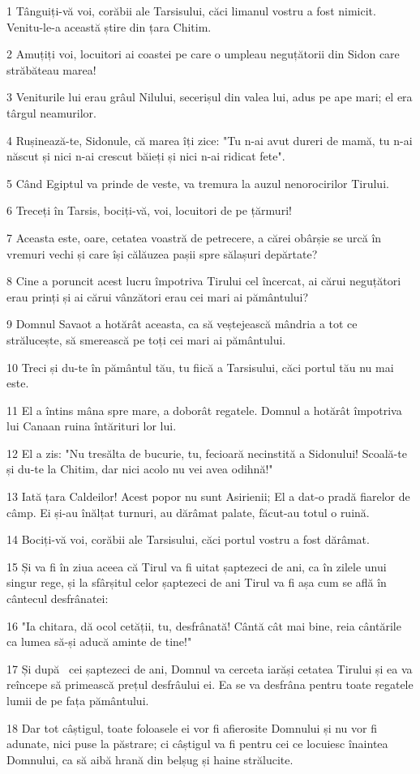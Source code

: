 \par 1 Tânguiți-vă voi, corăbii ale Tarsisului, căci limanul vostru a fost nimicit. Venitu-le-a această știre din țara Chitim.
\par 2 Amuțiți voi, locuitori ai coastei pe care o umpleau neguțătorii din Sidon care străbăteau marea!
\par 3 Veniturile lui erau grâul Nilului, secerișul din valea lui, adus pe ape mari; el era târgul neamurilor.
\par 4 Rușinează-te, Sidonule, că marea îți zice: "Tu n-ai avut dureri de mamă, tu n-ai născut și nici n-ai crescut băieți și nici n-ai ridicat fete".
\par 5 Când Egiptul va prinde de veste, va tremura la auzul nenorocirilor Tirului.
\par 6 Treceți în Tarsis, bociți-vă, voi, locuitori de pe țărmuri!
\par 7 Aceasta este, oare, cetatea voastră de petrecere, a cărei obârșie se urcă în vremuri vechi și care își călăuzea pașii spre sălașuri depărtate?
\par 8 Cine a poruncit acest lucru împotriva Tirului cel încercat, ai cărui neguțători erau prinți și ai cărui vânzători erau cei mari ai pământului?
\par 9 Domnul Savaot a hotărât aceasta, ca să veștejească mândria a tot ce strălucește, să smerească pe toți cei mari ai pământului.
\par 10 Treci și du-te în pământul tău, tu fiică a Tarsisului, căci portul tău nu mai este.
\par 11 El a întins mâna spre mare, a doborât regatele. Domnul a hotărât împotriva lui Canaan ruina întărituri lor lui.
\par 12 El a zis: "Nu tresălta de bucurie, tu, fecioară necinstită a Sidonului! Scoală-te și du-te la Chitim, dar nici acolo nu vei avea odihnă!"
\par 13 Iată țara Caldeilor! Acest popor nu sunt Asirienii; El a dat-o pradă fiarelor de câmp. Ei și-au înălțat turnuri, au dărâmat palate, făcut-au totul o ruină.
\par 14 Bociți-vă voi, corăbii ale Tarsisului, căci portul vostru a fost dărâmat.
\par 15 Și va fi în ziua aceea că Tirul va fi uitat șaptezeci de ani, ca în zilele unui singur rege, și la sfârșitul celor șaptezeci de ani Tirul va fi așa cum se află în cântecul desfrânatei:
\par 16 "Ia chitara, dă ocol cetății, tu, desfrânată! Cântă cât mai bine, reia cântările ca lumea să-și aducă aminte de tine!"
\par 17 Și după  cei șaptezeci de ani, Domnul va cerceta iarăși cetatea Tirului și ea va reîncepe să primească prețul desfrâului ei. Ea se va desfrâna pentru toate regatele lumii de pe fața pământului.
\par 18 Dar tot câștigul, toate foloasele ei vor fi afierosite Domnului și nu vor fi adunate, nici puse la păstrare; ci câștigul va fi pentru cei ce locuiesc înaintea Domnului, ca să aibă hrană din belșug și haine strălucite.

